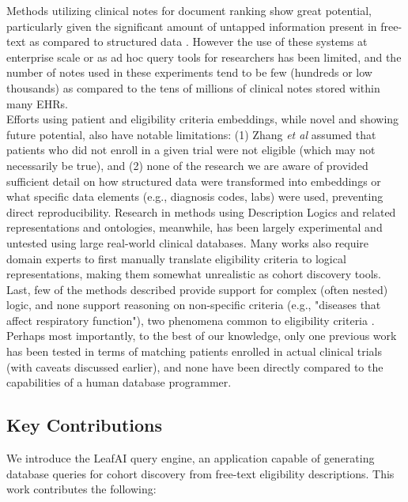\documentclass[../main.tex]{subfiles}
\begin{document}
\noindent Methods utilizing clinical notes for document ranking show great potential, particularly given the significant amount of untapped information present in free-text as compared to structured data \cite{warrer2012using}. However the use of these systems at enterprise scale or as ad hoc query tools for researchers has been limited, and the number of notes used in these experiments tend to be few (hundreds or low thousands) as compared to the tens of millions of clinical notes stored within many EHRs. \\

\noindent Efforts using patient and eligibility criteria embeddings, while novel and showing future potential, also have notable limitations: (1) Zhang \textit{et al} assumed that patients who did not enroll in a given trial were not eligible (which may not necessarily be true), and (2) none of the research we are aware of provided sufficient detail on how structured data were transformed into embeddings or what specific data elements (e.g., diagnosis codes, labs) were used, preventing direct reproducibility.  Research in methods using Description Logics and related representations and ontologies, meanwhile, has been largely experimental and untested using large real-world clinical databases. Many works also require domain experts to first manually translate eligibility criteria to logical representations, making them somewhat unrealistic as cohort discovery tools. \\

\noindent Last, few of the methods described provide support for complex (often nested) logic, and none support reasoning on non-specific criteria (e.g., "diseases that affect respiratory function"), two phenomena common to eligibility criteria \cite{wang2017classifying, ross2010analysis}. Perhaps most importantly, to the best of our knowledge, only one previous work has been tested in terms of matching patients enrolled in actual clinical trials \cite{zhang2020deepenroll} (with caveats discussed earlier), and none have been directly compared to the capabilities of a human database programmer. 

\subsection*{Key Contributions}

\noindent We introduce the LeafAI query engine, an application capable of generating database queries for cohort discovery from free-text eligibility descriptions. This work contributes the following:
\end{document}
